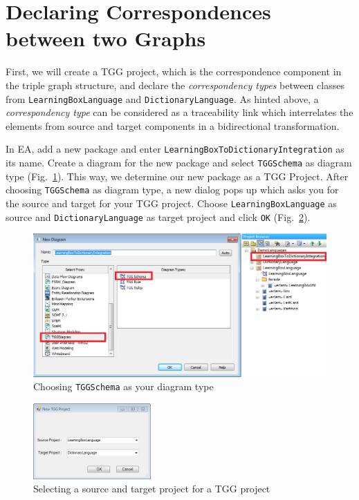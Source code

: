 \section{Declaring Correspondences between two Graphs}

First, we will create a TGG project, which is the correspondence component
in the triple graph structure, and declare the \emph{correspondency types}
between classes from \texttt{LearningBoxLanguage} and
\texttt{DictionaryLanguage}.
As hinted above, a \emph{correspondency type} can be considered as a
traceability link which interrelates the elements from source and target
components in a bidirectional transformation.

In EA, add a new package and enter
\texttt{Learning\-Box\-To\-Dictionary\-Integration} as its name. Create a
diagram for the new package and select \texttt{TGGSchema} as diagram type
(Fig.~\ref{fig:tgg_diagram_type}). This way, we determine our new package as a TGG Project. After choosing \texttt{TGGSchema} as diagram type, a new dialog pops up
which asks you for the source and target for your TGG project. Choose
\texttt{Learning\-Box\-Language} as source and \texttt{Dictionary\-Language} as
target project and click \texttt{OK} (Fig.~\ref{fig:select_source_target}).

\begin{figure}[htbp]
\begin{center}
  \includegraphics[width=\textwidth]{pics/tggBilder/tgg1}
  \caption{Choosing \texttt{TGGSchema} as your diagram type}  
  \label{fig:tgg_diagram_type}
\end{center}
\end{figure}

\begin{figure}[htbp]
\begin{center}
  \includegraphics[width=0.4\textwidth]{pics/tggBilder/tgg2}
  \caption{Selecting a source and target project for a TGG project}  
  \label{fig:select_source_target}
\end{center}
\end{figure}

